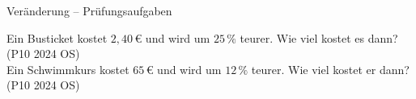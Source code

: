 \begin{aufgabe}{Veränderung – Prüfungsaufgaben}
\begin{teile}
\teil Ein Busticket kostet $2{,}40\,€$ und wird um $25\,\%$ teurer. Wie viel kostet es dann? \hfill (P10 2024 OS) \\ \leerfeld[€]
\teil Ein Schwimmkurs kostet $65\,€$ und wird um $12\,\%$ teurer. Wie viel kostet er dann? \hfill (P10 2024 OS) \\ \leerfeld[€]
\end{teile}
\end{aufgabe}
